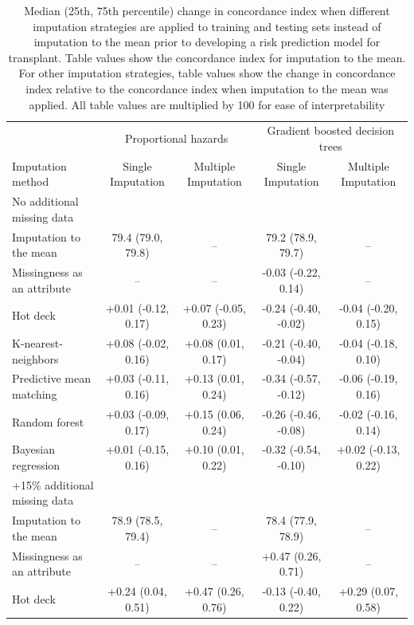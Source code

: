 \documentclass{article}
\begin{document}
\begin{table} 
 \caption{Median (25th, 75th percentile) change in concordance index when different imputation strategies are applied to training and testing sets instead of imputation to the mean prior to developing a risk prediction model for transplant. Table values show the concordance index for imputation to the mean. For other imputation strategies, table values show the change in concordance index relative to the concordance index when imputation to the mean was applied. All table values are multiplied by 100 for ease of interpretability} 
\label{tbl_md_strat_txpl_auc} 
 
\begin{tabular}{lcccc}
\toprule
& \multicolumn{2}{c}{Proportional hazards} & \multicolumn{2}{c}{Gradient boosted decision trees} \\ 
 \cmidrule(lr){2-3}\cmidrule(lr){4-5}
Imputation method & Single Imputation & Multiple Imputation & Single Imputation & Multiple Imputation \\ 
\midrule
\multicolumn{1}{l}{No additional missing data} \\ 
\midrule
Imputation to the mean & 79.4 (79.0, 79.8) & -- & 79.2 (78.9, 79.7) & -- \\ 
Missingness as an attribute & -- & -- & -0.03 (-0.22, 0.14) & -- \\ 
Hot deck & +0.01 (-0.12, 0.17) & +0.07 (-0.05, 0.23) & -0.24 (-0.40, -0.02) & -0.04 (-0.20, 0.15) \\ 
K-nearest-neighbors & +0.08 (-0.02, 0.16) & +0.08 (0.01, 0.17) & -0.21 (-0.40, -0.04) & -0.04 (-0.18, 0.10) \\ 
Predictive mean matching & +0.03 (-0.11, 0.16) & +0.13 (0.01, 0.24) & -0.34 (-0.57, -0.12) & -0.06 (-0.19, 0.16) \\ 
Random forest & +0.03 (-0.09, 0.17) & +0.15 (0.06, 0.24) & -0.26 (-0.46, -0.08) & -0.02 (-0.16, 0.14) \\ 
Bayesian regression & +0.01 (-0.15, 0.16) & +0.10 (0.01, 0.22) & -0.32 (-0.54, -0.10) & +0.02 (-0.13, 0.22) \\ 
\midrule
\multicolumn{1}{l}{+15\% additional missing data} \\ 
\midrule
Imputation to the mean & 78.9 (78.5, 79.4) & -- & 78.4 (77.9, 78.9) & -- \\ 
Missingness as an attribute & -- & -- & +0.47 (0.26, 0.71) & -- \\ 
Hot deck & +0.24 (0.04, 0.51) & +0.47 (0.26, 0.76) & -0.13 (-0.40, 0.22) & +0.29 (0.07, 0.58) \\ 

\end{tabular}
\end{table}
\end{document}
